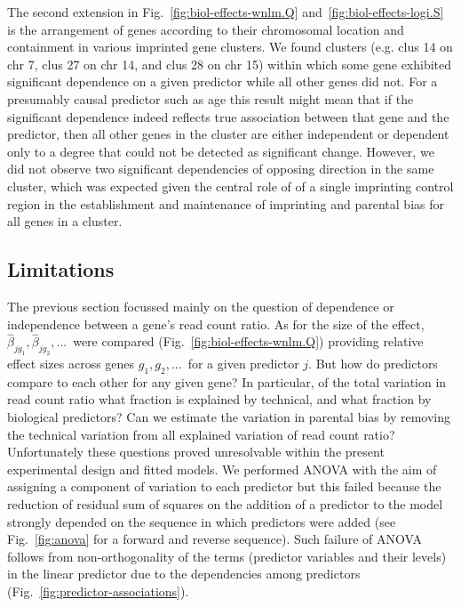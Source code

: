 \documentclass[letterpaper]{article}
\begin{document}
The second extension in Fig.~\ref{fig:biol-effects-wnlm.Q}
and~\ref{fig:biol-effects-logi.S} is the arrangement of genes according to
their chromosomal location and containment in various imprinted gene clusters.
We found clusters (e.g. clus 14 on chr 7, clus 27 on chr 14, and clus 28 on
chr 15) within which some gene exhibited significant dependence on a given
predictor while all other genes did not. For a presumably causal predictor such
as age this result might mean that if the significant dependence indeed
reflects true association between that gene and the predictor, then all other
genes in the cluster are either independent or dependent only to a degree that
could not be detected as significant change. However, we did not observe two
significant dependencies of opposing direction in the same cluster, which was
expected given the central role of of a single imprinting control region in
the establishment and maintenance of imprinting and parental bias for all
genes in a cluster.

\subsection{Limitations}

The previous section focussed mainly on the question of dependence or independence between a gene's read
count ratio. As for the size of the effect, \(\hat\beta_{jg_1},
\hat\beta_{jg_2},...\)~were compared (Fig.~\ref{fig:biol-effects-wnlm.Q}) providing relative
effect sizes across genes \(g_1, g_2,...\)~for a given predictor \(j\). But how do predictors compare to each
other for any given gene? In particular, of the total variation in read count ratio what fraction is
explained by technical, and what fraction by biological predictors? Can we estimate the variation in
parental bias by removing the technical variation from all explained variation of read count ratio?
Unfortunately these questions proved unresolvable within the present experimental design and
fitted models. We performed ANOVA with the aim of assigning a component of variation to
each predictor but this failed because the reduction of residual sum of squares on the addition of
a predictor to the model strongly depended on the sequence in which predictors were added (see
Fig.~\ref{fig:anova} for a forward and reverse sequence). Such failure of ANOVA follows from non-orthogonality
of the terms (predictor variables and their levels) in the linear predictor
due to the dependencies among predictors (Fig.~\ref{fig:predictor-associations}).
\end{document}

